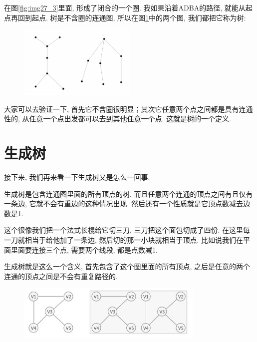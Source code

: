 在图\ref{fig:img27_3}里面, 形成了闭合的一个圈. 我如果沿着ADBA的路径, 就能从起点再回到起点. 树是不含圈的连通图, 所以在图\ref{fig:img27_4}中的两个图, 我们都把它称为树: 

\begin{figure}[ht]
  \centering
  \includegraphics[width=0.5\textwidth]{asset/20230924093316.png}
  \caption{}
  \label{fig:img27_4}
\end{figure}

大家可以去验证一下, 首先它不含圈很明显；其次它任意两个点之间都是具有连通性的, 从任意一个点出发都可以去到其他任意一个点. 这就是树的一个定义. 

\section{生成树}

接下来, 我们再来看一下生成树又是怎么一回事. 

生成树是包含连通图里面的所有顶点的树, 而且任意两个连通的顶点之间有且仅有一条边, 它就不会有重边的这种情况出现. 然后还有一个性质就是它顶点数减去边数是1. 

这个很像我们把一个法式长棍给它切三刀, 三刀把这个面包切成了四份. 在这里每一刀就相当于给他加了一条边, 然后切的那一小块就相当于顶点. 比如说我们在平面里面要连接三个点, 需要两个线段, 都是点数减1. 

生成树就是这么一个含义, 首先包含了这个图里面的所有顶点, 之后是任意的两个连通的顶点之间是不会有重复路径的. 

\begin{figure}[ht]
  \centering
  \includegraphics[width=0.8\textwidth]{asset/9560c897-3d1c-4169-9c28-681e0ccc1251.png}
  \caption{}
  \label{fig:img27_5}
\end{figure}

